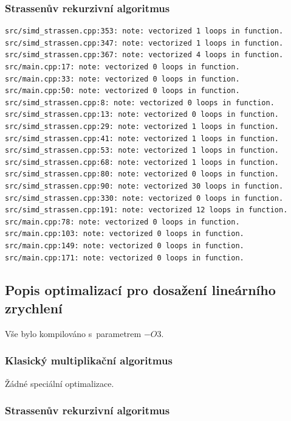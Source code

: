 \documentclass[12pt,a4paper]{article}
\begin{document}
\subsubsection{Strassenův rekurzivní algoritmus}

\begin{verbatim}
src/simd_strassen.cpp:353: note: vectorized 1 loops in function.
src/simd_strassen.cpp:347: note: vectorized 1 loops in function.
src/simd_strassen.cpp:367: note: vectorized 4 loops in function.
src/main.cpp:17: note: vectorized 0 loops in function.
src/main.cpp:33: note: vectorized 0 loops in function.
src/main.cpp:50: note: vectorized 0 loops in function.
src/simd_strassen.cpp:8: note: vectorized 0 loops in function.
src/simd_strassen.cpp:13: note: vectorized 0 loops in function.
src/simd_strassen.cpp:29: note: vectorized 1 loops in function.
src/simd_strassen.cpp:41: note: vectorized 1 loops in function.
src/simd_strassen.cpp:53: note: vectorized 1 loops in function.
src/simd_strassen.cpp:68: note: vectorized 1 loops in function.
src/simd_strassen.cpp:80: note: vectorized 0 loops in function.
src/simd_strassen.cpp:90: note: vectorized 30 loops in function.
src/simd_strassen.cpp:330: note: vectorized 0 loops in function.
src/simd_strassen.cpp:191: note: vectorized 12 loops in function.
src/main.cpp:78: note: vectorized 0 loops in function.
src/main.cpp:103: note: vectorized 0 loops in function.
src/main.cpp:149: note: vectorized 0 loops in function.
src/main.cpp:171: note: vectorized 0 loops in function.

\end{verbatim}



\subsection{Popis optimalizací pro dosažení lineárního zrychlení}

Vše bylo kompilováno s~parametrem $-O3$.

\subsubsection{Klasický multiplikační algoritmus}

Žádné speciální optimalizace.


\subsubsection{Strassenův rekurzivní algoritmus}
\end{document}
